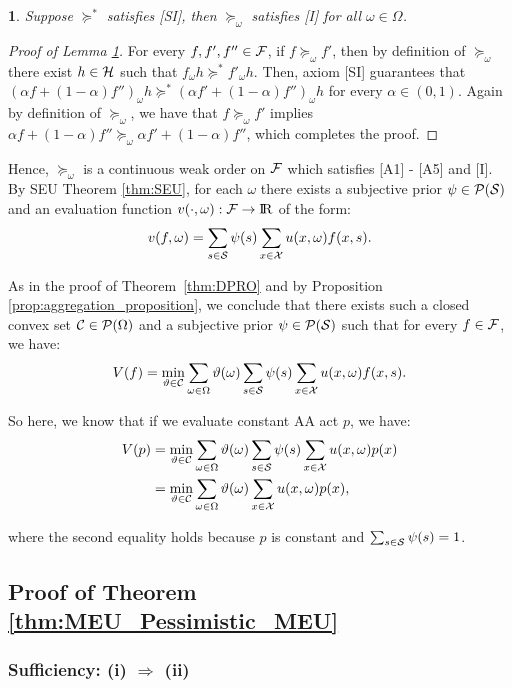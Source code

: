 \documentclass[11pt,oneside]{article}
\theoremstyle{plain}
\theoremstyle{plain}
\theoremstyle{plain}
\theoremstyle{plain}
\theoremstyle{plain}
\theoremstyle{definition}
\theoremstyle{definition}
\theoremstyle{remark}
\theoremstyle{plain}
\newtheorem{lem}[thm]{\protect\lemmaname}
\providecommand{\lemmaname}{Lemma}
\newcommand{\R}{{\rm I\!R}}
\newcommand{\F}{{\cal F}}
\newcommand{\pfo}{\pf_\omega}
\newcommand{\calps}{{\cal P}({\cal S})}
\newcommand{\mcs}{{\cal S}}
\newcommand{\mcx}{{\cal X}}
\newcommand{\pf}{\succeq}
\newcommand{\pfs}{\succeq^*}
\newcommand{\convmix}[2]{\alpha #1 + (1-\alpha) #2}
\newcommand{\omix}[2]{#1_\omega #2 }
\begin{document}
\begin{lem}
\label{lem:state_dep_preference_independence_lem}
Suppose $\pfs$ satisfies [SI], then $\pfo$ satisfies [I] for all $\omega \in \Omega$.  
\end{lem}
\begin{proof}[Proof of Lemma \ref{lem:state_dep_preference_independence_lem}]
For every $f,f',f'' \in \F$, if $f\pfo f'$, then by definition of $\pfo$ there exist $h \in {\cal H}$ such that $\omix{f}{h} \pfs \omix{f'}{h}$. Then, axiom
[SI] guarantees that $  \omix{\left(\convmix{f}{f''}\right)}{h} \pfs \omix{\left(\convmix{f'}{f''}\right)}{h}$ for every $\alpha \in (0,1)$. Again by definition of
$\pfo$, we have that $f\pfo f'$ implies $\convmix{f}{f''} \pfo \convmix{f'}{f''}$, which completes the proof.   
\end{proof}

Hence, $\pfo$ is a continuous weak order on $\F$ which satisfies [A1] - [A5] and [I]. By SEU Theorem \ref{thm:SEU}, for each $\omega$ there exists a subjective prior $\psi \in \calps$ and an evaluation function $v(\cdot,\omega): \F \to \R$ of the form:
\[
v(f,\omega) = \sum_{s\in \mcs} \psi(s)\sum_{x \in \mcx} u(x,\omega) f(x,s).
\]

As in the proof of Theorem~\ref{thm:DPRO} and by Proposition \ref{prop:aggregation_proposition}, we conclude that there exists such a closed convex set ${\cal C} \in \mathcal{P}(\Omega)$ and a subjective prior $\psi \in \calps$ such that for every $f \in \F$, we have:
\[
V(f) = \min_{\vartheta \in {\cal C}} \sum_{\omega \in \Omega} \vartheta(\omega) \sum_{s\in \mcs} \psi(s) \sum_{x\in \mcx} u(x,\omega)f(x,s).
\]

So here, we know that if we evaluate constant AA act $p$, we have:
\begin{align*}
    V(p) &= \min_{\vartheta \in {\cal C}} \sum_{\omega \in \Omega} \vartheta(\omega) \sum_{s\in \mcs} \psi(s) \sum_{x\in \mcx} u(x,\omega)p(x) \\
    &= \min_{\vartheta \in {\cal C}} \sum_{\omega \in \Omega} \vartheta(\omega) \sum_{x\in \mathcal{X}}u(x,\omega)p(x),
\end{align*}

where the second equality holds because $p$ is constant and $\sum_{s\in \mcs} \psi(s) = 1$. 

\subsection{Proof of Theorem \ref{thm:MEU_Pessimistic_MEU}}
\subsubsection{Sufficiency: (i) $\Rightarrow$ (ii)}
\end{document}
